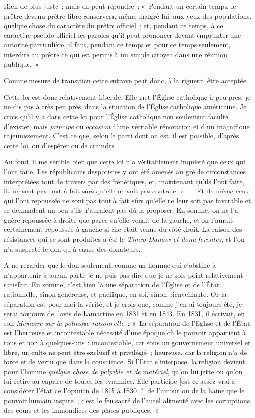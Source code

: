 \documentclass[french,twoside]{book} %
\begin{document}
Rien de plus juste ; mais on peut répondre : « Pendant un certain temps, le prêtre devenu prêtre libre conservera, même malgré lui, aux yeux des populations, quelque chose du caractère du prêtre officiel ; et, pendant ce temps, à ce caractère pseudo-officiel les paroles qu’il peut prononcer devant emprunter une autorité particulière, il faut, pendant ce temps et pour ce temps seulement, interdire au prêtre ce qui est permis à un simple citoyen dans une réunion publique. »\par
Comme mesure de transition cette entrave peut donc, à la rigueur, être acceptée.\par
Cette loi est donc relativement libérale. Elle met l’Église catholique à peu près, je ne dis pas à très peu près, dans la situation de l’Église  catholique américaine. Je crois qu’il y a dans cette loi pour l’Église catholique non seulement faculté d’exister, mais {\itshape principe} ou {\itshape occasion} d’une véritable rénovation et d’un magnifique rajeunissement. C’est ce que, selon le parti dont on est, il est possible, d’après cette loi, ou d’espérer ou de craindre.\par
Au fond, il me semble bien que cette loi n’a véritablement inquiété que ceux qui l’ont faite. Les républicains despotistes y ont été amenés au gré de circonstances interprétées tout de travers par des frénétiques, et, maintenant qu’ils l’ont faite, ils ne sont pas tout à fait sûrs qu’elle ne soit pas contre eux. — Et de même ceux qui l’ont repoussée ne sont pas tout à fait sûrs qu’elle ne leur soit pas favorable et se demandent un peu s’ils n’auraient pas dû la proposer. En somme, on ne l’a guère repoussée à droite que parce qu’elle venait de la gauche, et on l’aurait certainement repoussée à gauche si elle était venue du côté droit. La raison des résistances qui se sont produites a été le {\itshape Timeo Danaos et dona ferentes}, et l’on n’a suspecté le don qu’à cause des donateurs.\par
A ne regarder que le don seulement, comme un homme qui s’obstine à n’appartenir à aucun parti, je ne puis pas dire que je ne sois point relativement satisfait. En somme, c’est bien là une  séparation de l’Église et de l’État rationnelle, sinon généreuse, et pacifique, en soi, sinon bienveillante. Or la séparation est pour moi la vérité, et je crois que, comme j’en ai toujours été, je serai toujours de l’avis de Lamartine en 1831 et en 1843. En 1831, il écrivait, en son \emph{Mémoire sur la politique rationnelle} : « La séparation de l’Église et de l’État est l’heureuse et incontestable nécessité d’une époque où le pouvoir appartient à tous et non à quelques-uns : incontestable, car sous un gouvernement universel et libre, un culte ne peut être exclusif et privilégié ; heureuse, car la religion n’a de force et de vertu que dans la conscience. Si l’État s’interpose, la religion devient pour l’homme {\itshape quelque chose de palpable et de matériel}, qu’on lui jette ou qu’on lui retire au caprice de toutes les tyrannies. Elle participe [est-ce assez vrai à considérer l’état de l’opinion de 1815 à 1830 ?] de l’amour ou de la haine que le pouvoir humain inspire ; c’est le feu sacré de l’autel alimenté avec les corruptions des cours et les immondices des places publiques. »\par
\end{document}
